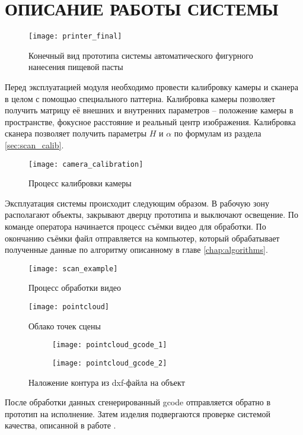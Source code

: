 \chapter{ОПИСАНИЕ РАБОТЫ СИСТЕМЫ}
    \begin{figure}[H]
        \centering
        \texttt{[image: printer\_final]}\\
        \caption{Конечный вид прототипа системы автоматического фигурного нанесения пищевой пасты}
    \end{figure}

    Перед эксплуатацией модуля необходимо провести калибровку камеры и сканера в целом с помощью специального паттерна. Калибровка камеры позволяет получить матрицу её внешних и внутренних параметров -- положение камеры в пространстве, фокусное расстояние и реальный центр изображения.
    Калибровка сканера позволяет получить параметры $ H $ и $ \alpha $ по формулам из раздела \ref{sec:scan_calib}. 
    
    \begin{figure}[H]
        \centering
        \texttt{[image: camera\_calibration]}
        \caption{Процесс калибровки камеры}
    \end{figure}
    
    Эксплуатация системы происходит следующим образом. В рабочую зону располагают объекты, закрывают дверцу прототипа и выключают освещение. По команде оператора начинается процесс съёмки видео для обработки. По окончанию съёмки файл отправляется на компьютер, который обрабатывает полученные данные по алгоритму описанному в главе \ref{chap:algorithms}.
    
    \begin{figure}[H]
        \centering
        \texttt{[image: scan\_example]}
        \caption{Процесс обработки видео}
    \end{figure}
    \begin{figure}[H]
        \centering
        \texttt{[image: pointcloud]}
        \caption{Облако точек сцены}
    \end{figure}
    \begin{figure}[H]
        \begin{subfigure}{0.5\linewidth}
            \texttt{[image: pointcloud\_gcode\_1]}
        \end{subfigure}
        \begin{subfigure}{0.5\linewidth}
            \texttt{[image: pointcloud\_gcode\_2]}
        \end{subfigure}
        \caption{Наложение контура из dxf-файла на объект}
    \end{figure}
    
    После обработки данных сгенерированный gcode отправляется обратно в прототип на исполнение. Затем изделия подвергаются проверке системой качества, описанной в работе \cite{mayor}.